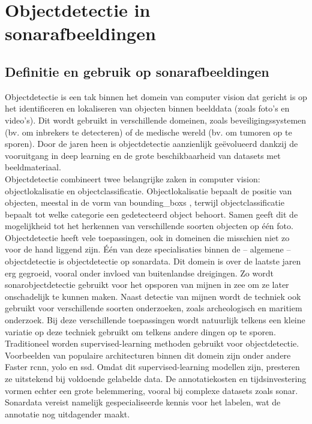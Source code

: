 \section{Objectdetectie in sonarafbeeldingen}

\subsection{Definitie en gebruik op sonarafbeeldingen}
\label{subsec:definitie-en-gebruik-op-sonarafbeeldingen}

Objectdetectie is een tak binnen het domein van computer vision dat gericht is op het identificeren en lokaliseren van objecten binnen beelddata (zoals foto's en video's). Dit wordt gebruikt in verschillende domeinen, zoals beveiligingssystemen (bv. om inbrekers te detecteren) of de medische wereld (bv. om tumoren op te sporen). Door de jaren heen is objectdetectie aanzienlijk geëvolueerd dankzij de vooruitgang in deep learning en de grote beschikbaarheid van datasets met beeldmateriaal. \autocite{He_2016} \\

Objectdetectie combineert twee belangrijke zaken in computer vision: objectlokalisatie en objectclassificatie. Objectlokalisatie bepaalt de positie van objecten, meestal in de vorm van \glspl{bounding_box} \autocite{Tompson_2015}, terwijl objectclassificatie bepaalt tot welke categorie een gedetecteerd object behoort. Samen geeft dit de mogelijkheid tot het herkennen van verschillende soorten objecten op één foto. \\

Objectdetectie heeft vele toepassingen, ook in domeinen die misschien niet zo voor de hand liggend zijn. Één van deze specialisaties binnen de -- algemene -- objectdetectie is objectdetectie op sonardata. Dit domein is over de laatste jaren erg gegroeid, vooral onder invloed van buitenlandse dreigingen. Zo wordt sonarobjectdetectie gebruikt voor het opsporen van mijnen in zee om ze later onschadelijk te kunnen maken. Naast detectie van mijnen wordt   de techniek ook gebruikt voor verschillende soorten onderzoeken, zoals archeologisch en maritiem onderzoek. Bij deze verschillende toepassingen wordt natuurlijk telkens een kleine variatie op deze techniek gebruikt om telkens andere dingen op te sporen. \autocite{Wang_2024} \\

Traditioneel worden supervised-learning methoden gebruikt voor objectdetectie. Voorbeelden van populaire architecturen binnen dit domein zijn onder andere Faster \gls{rcnn}, \gls{yolo} en \gls{ssd}. \autocite{Redmon_2016} Omdat dit supervised-learning modellen zijn, presteren  ze uitstekend bij voldoende gelabelde data. De annotatiekosten en tijdsinvestering vormen echter een grote belemmering, vooral bij complexe datasets zoals sonar. Sonardata vereist namelijk gespecialiseerde kennis voor het labelen, wat de annotatie nog uitdagender maakt. \autocite{Long_2015} \\

